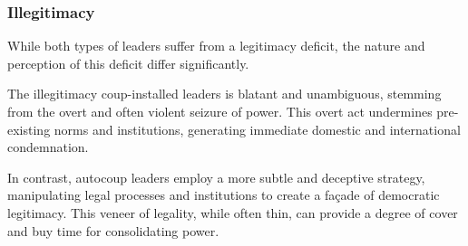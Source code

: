 \documentclass[
  12pt,
]{report}
\newcommand{\blandscape}{\begin{landscape}}
\newcommand{\elandscape}{\end{landscape}}
\begin{document}
\blandscape

\begin{table}

\caption{\label{tbl-leaders}Main features of autocoup and coup-installed
leaders}


\end{table}%

\elandscape

\subsubsection*{Illegitimacy}\label{illegitimacy}

While both types of leaders suffer from a legitimacy deficit, the nature
and perception of this deficit differ significantly.

The illegitimacy coup-installed leaders is blatant and unambiguous,
stemming from the overt and often violent seizure of power. This overt
act undermines pre-existing norms and institutions, generating immediate
domestic and international condemnation.

In contrast, autocoup leaders employ a more subtle and deceptive
strategy, manipulating legal processes and institutions to create a
façade of democratic legitimacy. This veneer of legality, while often
thin, can provide a degree of cover and buy time for consolidating
power.
\end{document}
